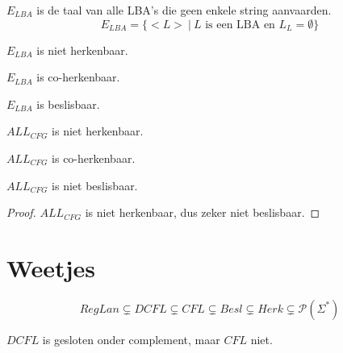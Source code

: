 \documentclass[main.tex]{subfiles}
\begin{document}
\begin{de}
  \label{de:e-lba}
  $E_{LBA}$ is de taal van alle LBA's die geen enkele string aanvaarden.
  \[ E_{LBA} = \{ <L> \ |\ L \text{ is een LBA en } L_{L} = \emptyset \} \]
\end{de}

\begin{st}
  \label{st:e-lba-niet-herk}
  $E_{LBA}$ is niet herkenbaar.
\end{st}

\begin{st}
  \label{st:e-lba-coherk}
  $E_{LBA}$ is co-herkenbaar.
\end{st}

\begin{gev}
  $E_{LBA}$ is beslisbaar.
\end{gev}


\begin{st}
  \label{st:all-cfg-niet-herk}
  $ALL_{CFG}$ is niet herkenbaar. \zb
\end{st}

\begin{st}
  \label{st:all-cfg-coherk}
  $ALL_{CFG}$ is co-herkenbaar.
\end{st}

\begin{gev}
  \label{gev:all-cfg-niet-besl}
  $ALL_{CFG}$ is niet beslisbaar.

  \begin{proof}
    $ALL_{CFG}$ is niet herkenbaar, dus zeker niet beslisbaar.
  \end{proof}
\end{gev}


\section{Weetjes}
\label{sec:weetjes}

\begin{st}
  \[ RegLan \subsetneq DCFL \subsetneq CFL \subsetneq Besl \subsetneq Herk \subsetneq \mathcal{P}(\Sigma^{*}) \]
\end{st}

\begin{st}
  $DCFL$ is gesloten onder complement, maar $CFL$ niet. 
\end{st}
\end{document}
